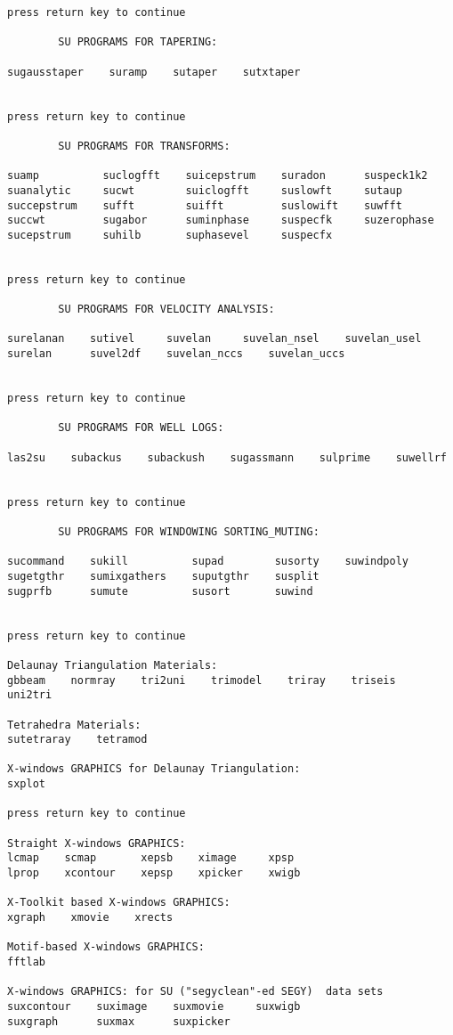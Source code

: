 {\begin{verbatim}
press return key to continue
 
        SU PROGRAMS FOR TAPERING:
 
sugausstaper  	suramp    sutaper    sutxtaper  


press return key to continue
 
        SU PROGRAMS FOR TRANSFORMS:
 
suamp          suclogfft    suicepstrum    suradon  	suspeck1k2  
suanalytic     sucwt  	    suiclogfft     suslowft  	sutaup  
succepstrum    sufft  	    suifft  	   suslowift  	suwfft  
succwt         sugabor      suminphase     suspecfk  	suzerophase  
sucepstrum     suhilb       suphasevel     suspecfx  


press return key to continue
 
        SU PROGRAMS FOR VELOCITY ANALYSIS:
 
surelanan    sutivel  	 suvelan  	 suvelan_nsel    suvelan_usel  
surelan      suvel2df    suvelan_nccs    suvelan_uccs  


press return key to continue
 
        SU PROGRAMS FOR WELL LOGS:
 
las2su    subackus    subackush    sugassmann    sulprime    suwellrf  


press return key to continue
 
        SU PROGRAMS FOR WINDOWING SORTING_MUTING:
 
sucommand    sukill  	     supad  	  susorty    suwindpoly  
sugetgthr    sumixgathers    suputgthr    susplit  
sugprfb      sumute  	     susort  	  suwind  


press return key to continue

Delaunay Triangulation Materials:
gbbeam    normray    tri2uni  	trimodel    triray    triseis    uni2tri  

Tetrahedra Materials:
sutetraray    tetramod  

X-windows GRAPHICS for Delaunay Triangulation:
sxplot  

press return key to continue

Straight X-windows GRAPHICS:
lcmap    scmap       xepsb    ximage  	 xpsp  
lprop    xcontour    xepsp    xpicker    xwigb  

X-Toolkit based X-windows GRAPHICS:
xgraph    xmovie    xrects  

Motif-based X-windows GRAPHICS:
fftlab  

X-windows GRAPHICS: for SU ("segyclean"-ed SEGY)  data sets
suxcontour    suximage    suxmovie     suxwigb  
suxgraph      suxmax  	  suxpicker  


\end{verbatim}}
